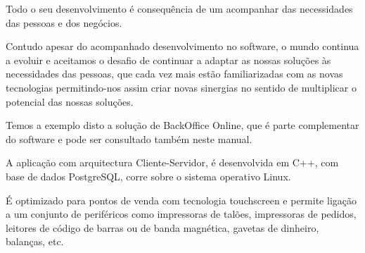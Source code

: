 \documentclass[a4paper,11pt,openany]{memoir}
\begin{document}
Todo o seu desenvolvimento é consequência de um acompanhar das necessidades das pessoas e dos negócios.

Contudo apesar do acompanhado desenvolvimento no software, o mundo
 continua a evoluir e aceitamos o desafio de continuar a adaptar
 as nossas soluções às necessidades das pessoas, que cada vez mais
 estão familiarizadas com as novas tecnologias permitindo-nos
 assim criar novas sinergias no sentido de multiplicar o potencial das nossas soluções.


Temos a exemplo disto a solução de BackOffice Online, que é parte complementar do software e pode ser consultado também neste manual.

A aplicação com arquitectura Cliente-Servidor, é desenvolvida em C++, com base de dados PostgreSQL, corre sobre o sistema operativo Linux.


É optimizado para pontos de venda com tecnologia touchscreen e permite ligação a um conjunto de periféricos como impressoras de talões,
impressoras de pedidos, leitores de código de barras ou de banda magnética, gavetas de dinheiro, balanças, etc.
\end{document}

